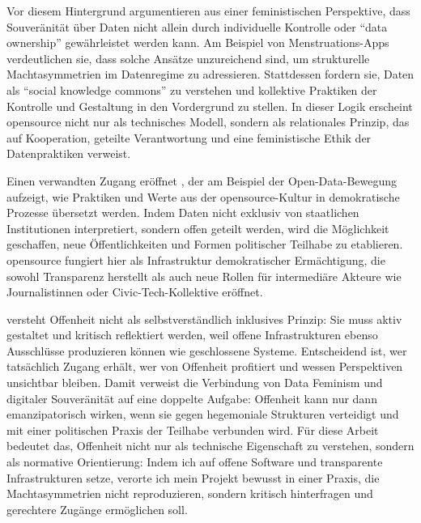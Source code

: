 Vor diesem Hintergrund argumentieren \textcite{gurumurthyDataBodiesNew2022} aus einer feministischen Perspektive, dass Souveränität über Daten nicht allein durch individuelle Kontrolle oder \enquote{data ownership} gewährleistet werden kann. Am Beispiel von Menstruations-Apps verdeutlichen sie, dass solche Ansätze unzureichend sind, um strukturelle Machtasymmetrien im Datenregime zu adressieren. Stattdessen fordern sie, Daten als \enquote{social knowledge commons} zu verstehen und kollektive Praktiken der Kontrolle und Gestaltung in den Vordergrund zu stellen. In dieser Logik erscheint \gls{opensource} nicht nur als technisches Modell, sondern als relationales Prinzip, das auf Kooperation, geteilte Verantwortung und eine feministische Ethik der Datenpraktiken verweist.

Einen verwandten Zugang eröffnet \textcite{baackDataficationEmpowermentHow2015}, der am Beispiel der Open-Data-Bewegung aufzeigt, wie Praktiken und Werte aus der \gls{opensource}-Kultur in demokratische Prozesse übersetzt werden. Indem Daten nicht exklusiv von staatlichen Institutionen interpretiert, sondern offen geteilt werden, wird die Möglichkeit geschaffen, neue Öffentlichkeiten und Formen politischer Teilhabe zu etablieren. \gls{opensource} fungiert hier als Infrastruktur demokratischer Ermächtigung, die sowohl Transparenz herstellt als auch neue Rollen für intermediäre Akteure wie Journalist\genderstern innen oder Civic-Tech-Kollektive eröffnet.

\textcite{wilshireTimeRebootFeminism2024} versteht Offenheit nicht als selbstverständlich inklusives Prinzip: Sie muss aktiv gestaltet und kritisch reflektiert werden, weil offene Infrastrukturen ebenso Ausschlüsse produzieren können wie geschlossene Systeme. Entscheidend ist, wer tatsächlich Zugang erhält, wer von Offenheit profitiert und wessen Perspektiven unsichtbar bleiben. Damit verweist die Verbindung von Data Feminism und digitaler Souveränität auf eine doppelte Aufgabe: Offenheit kann nur dann emanzipatorisch wirken, wenn sie gegen hegemoniale Strukturen verteidigt und mit einer politischen Praxis der Teilhabe verbunden wird. Für diese Arbeit bedeutet das, Offenheit nicht nur als technische Eigenschaft zu verstehen, sondern als normative Orientierung: Indem ich auf offene Software und transparente Infrastrukturen setze, verorte ich mein Projekt bewusst in einer Praxis, die Machtasymmetrien nicht reproduzieren, sondern kritisch hinterfragen und gerechtere Zugänge ermöglichen soll.